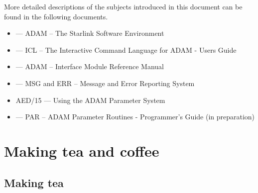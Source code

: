 \documentclass[twoside,11pt,nolof]{starlink}
\begin{document}
More detailed descriptions of the subjects introduced in this document
can be found in the following documents.
\begin{itemize}
\item {} --- ADAM -- The Starlink Software Environment
\item {} --- ICL -- The Interactive Command Language for ADAM - Users Guide
\item {} --- ADAM --  Interface Module Reference Manual
\item {} --- MSG and ERR -- Message and Error Reporting System
\item AED/15 --- Using the ADAM Parameter System
\item {} --- PAR -- ADAM Parameter Routines - Programmer's Guide
(in preparation)
\end{itemize}

\appendix
\newpage

\section{Making tea and coffee\label{make}}

\subsection{Making tea}
\end{document}
